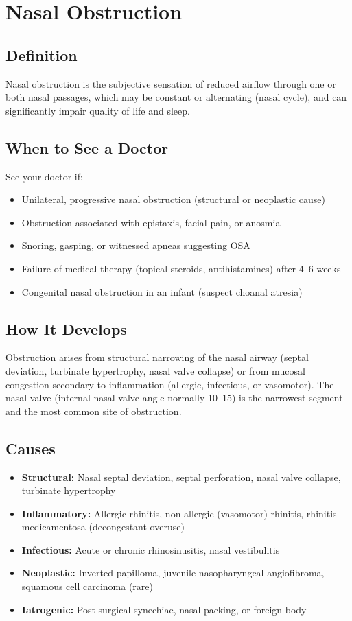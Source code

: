 \chapter{Nasal Obstruction}

\section*{Definition}
Nasal obstruction is the subjective sensation of reduced airflow through one or both nasal passages, which may be constant or alternating (nasal cycle), and can significantly impair quality of life and sleep.

\section*{When to See a Doctor}
See your doctor if:
\begin{itemize}
  \item Unilateral, progressive nasal obstruction (structural or neoplastic cause)
  \item Obstruction associated with epistaxis, facial pain, or anosmia
  \item Snoring, gasping, or witnessed apneas suggesting OSA
  \item Failure of medical therapy (topical steroids, antihistamines) after 4--6 weeks
  \item Congenital nasal obstruction in an infant (suspect choanal atresia)
\end{itemize}

\section*{How It Develops}
Obstruction arises from structural narrowing of the nasal airway (septal deviation, turbinate hypertrophy, nasal valve collapse) or from mucosal congestion secondary to inflammation (allergic, infectious, or vasomotor). The nasal valve (internal nasal valve angle normally 10--15\textdegree) is the narrowest segment and the most common site of obstruction.

\section*{Causes}
\begin{itemize}
  \item \textbf{Structural:} Nasal septal deviation, septal perforation, nasal valve collapse, turbinate hypertrophy
  \item \textbf{Inflammatory:} Allergic rhinitis, non-allergic (vasomotor) rhinitis, rhinitis medicamentosa (decongestant overuse)
  \item \textbf{Infectious:} Acute or chronic rhinosinusitis, nasal vestibulitis
  \item \textbf{Neoplastic:} Inverted papilloma, juvenile nasopharyngeal angiofibroma, squamous cell carcinoma (rare)
  \item \textbf{Iatrogenic:} Post-surgical synechiae, nasal packing, or foreign body
\end{itemize}

